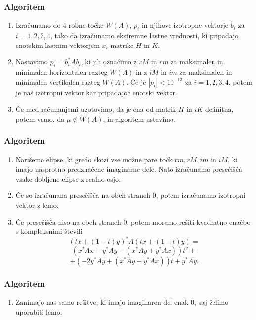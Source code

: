 \documentclass{beamer}
\newcommand{\C}{\mathbb C}
\newcounter{saveenumi}
\newcommand{\seti}{\setcounter{saveenumi}{\value{enumi}}}
\newcommand{\conti}{\setcounter{enumi}{\value{saveenumi}}}
\begin{document}
\begin{frame}
\frametitle{Algoritem}
\begin{enumerate}[1.]
\item Izračunamo do 4 robne točke $W(A)$, $p_i$ in njihove izotropne vektorje $b_i$ za $i=1,2,3,4$, tako da izračunamo ekstremne lastne vrednosti, ki pripadajo enotskim lastnim vektorjem $x_i$ matrike $H$ in $K$.\medskip
\item Nastavimo $p_i =b^\ast _i Ab_i$, ki jih označimo z $rM$ in $rm$ za maksimalen in minimalen horizontalen razteg $W(A)$ in z $iM$ in $im$ za maksimalen in minimalen vertikalen razteg $W(A)$.  Če je $|p_i|<10^{-13}$  za $i=1,2,3,4$, potem je naš izotropni vektor kar pripadajoč enotski vektor.\medskip
\item Če med računanjemi ugotovimo, da je ena od matrik $H$ in $iK$ definitna, potem vemo, da $\mu \not\in W(A)$, in algoritem ustavimo.
\seti
\end{enumerate}
\end{frame}\begin{frame}
\frametitle{Algoritem}
\begin{enumerate}[1.]
\conti
\item Narišemo elipse, ki gredo skozi vse možne pare točk $rm, rM, im$ in $iM$, ki imajo nasprotno predznačene imaginarne dele. Nato izračunamo presečišča vsake dobljene elipse z realno osjo\medskip.%
\item Če so izračunana presečišča na obeh straneh 0, potem izračunamo izotropni vektor z lemo.\medskip
\item Če presečišča niso na obeh straneh 0, potem moramo rešiti kvadratno enačbo s kompleksnimi števili
$$(tx +(1-t)y)^\ast A(tx+(1-t)y)  =$$
$$(x^\ast Ax+y^\ast Ay -(x^\ast Ay +y^\ast Ax))t^2 +$$
$$+(-2y^\ast Ay +(x^\ast Ay+y^\ast Ax))t +y^\ast Ay.$$
\seti
\end{enumerate}
\end{frame}\begin{frame}
\frametitle{Algoritem}
\begin{enumerate}[1.]
\conti
\item Zanimajo nas samo rešitve, ki imajo imaginaren del enak 0, saj želimo uporabiti lemo.

\end{enumerate}
\end{frame}
\end{document}
